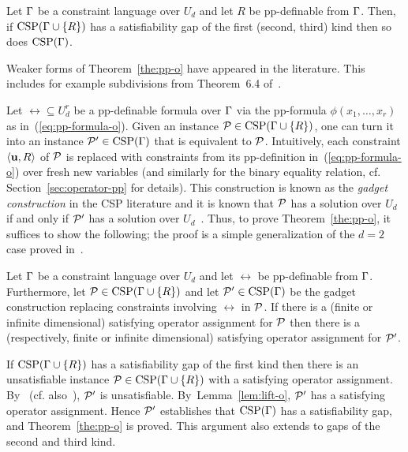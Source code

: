 \documentclass[11pt,letter]{article}
\begin{document}
\begin{theorem}\label{the:pp-o}
  Let $\Gamma$ be a constraint language over $U_d$ and let $R$ be pp-definable from
  $\Gamma$. Then, if ${\rm CSP}(\Gamma\cup\{R\})$ has a satisfiability gap of the first (second, third) kind then so does
  ${\rm CSP}(\Gamma)$.
\end{theorem}

Weaker forms of Theorem~\ref{the:pp-o} have appeared in the literature. This includes for example subdivisions from Theorem~6.4 of~\cite{Mastel24:stoc}.

Let $\rel\subseteq U_d^r$ be a pp-definable formula
over $\Gamma$ via the pp-formula $\phi(x_1,\ldots,x_r)$ as in~(\ref{eq:pp-formula-o}).
Given an instance
${\mathcal P}\in{\rm CSP}(\Gamma\cup\{R\})$, one can turn it into an instance
${\mathcal P}'\in{\rm CSP}(\Gamma)$ that is equivalent to ${\mathcal P}$. 
Intuitively, each constraint $\langle {\bf u},R \rangle$ of ${\mathcal P}$ is replaced with
constraints 
from its pp-definition in~(\ref{eq:pp-formula-o})
over fresh new variables (and similarly for the binary equality relation, cf. Section~\ref{sec:operator-pp} for details).
This construction is known as the \emph{gadget construction} in the CSP
literature and it is known that ${\mathcal P}$ has a solution over $U_d$
if and only if ${\mathcal P}'$ has a solution over $U_d$~\cite{Bulatov05:classifying,BKW17}.
Thus, to prove Theorem~\ref{the:pp-o}, it suffices to show the following;
the proof is a simple generalization of the $d=2$ case
proved in~\cite{AKS19:jcss}.

\begin{lemma}\label{lem:lift-o}
  Let $\Gamma$ be a constraint language over $U_d$ and let $\rel$ be pp-definable
  from $\Gamma$. Furthermore, let ${\mathcal P}\in{\rm CSP}(\Gamma\cup\{R\})$ and let
  ${\mathcal P}'\in{\rm CSP}(\Gamma)$ be the gadget construction replacing constraints involving
  $\rel$ in ${\mathcal P}$. If there is a (finite or infinite dimensional) satisfying operator assignment for ${\mathcal P}$ then there is a (respectively, finite or infinite dimensional) satisfying operator assignment for ${\mathcal P}'$. 
\end{lemma}

If ${\rm CSP}(\Gamma\cup\{R\})$ has a satisfiability gap of the first kind then there is
an unsatisfiable instance ${\mathcal P}\in{\rm CSP}(\Gamma\cup\{R\})$ with a satisfying
operator assignment. By~\cite{Bulatov05:classifying} (cf.
also~\cite{BKW17}), ${\mathcal P}'$ is unsatisfiable. By~Lemma~\ref{lem:lift-o}, ${\mathcal P}'$ has a satisfying operator assignment. 
Hence ${\mathcal P}'$ establishes that ${\rm CSP}(\Gamma)$ has a satisfiability gap, and
Theorem~\ref{the:pp-o} is proved. This argument also extends to gaps of the second and third kind.
\end{document}
